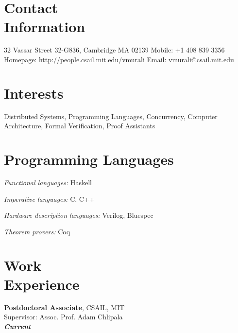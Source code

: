 \documentclass[margin]{resume}
\begin{document}
\begin{resume}

    \section{\mysidestyle Contact\\Information}

    32 Vassar Street 32-G836, Cambridge MA 02139   \hfill Mobile: +1 408 839 3356          \\
    Homepage: http://people.csail.mit.edu/vmurali     \hfill Email: vmurali@csail.mit.edu    \\

    \section{\mysidestyle Interests}

    Distributed Systems, Programming Languages, Concurrency, Computer Architecture, Formal Verification, Proof Assistants\\


    \section{\mysidestyle Programming Languages}
    \begin{list2}
    \item \emph{Functional languages:} Haskell
    \item \emph{Imperative languages:} C, C++
    \item \emph{Hardware description languages:} Verilog, Bluespec
    \item \emph{Theorem provers:} Coq
    \end{list2}

    \section{\mysidestyle Work\\Experience}
    \textbf{Postdoctoral Associate}, CSAIL, MIT\\
    Supervisor: Assoc. Prof. Adam Chlipala\\
    \hfill \textbf{\textit{Current}}


\end{resume}
\end{document}
